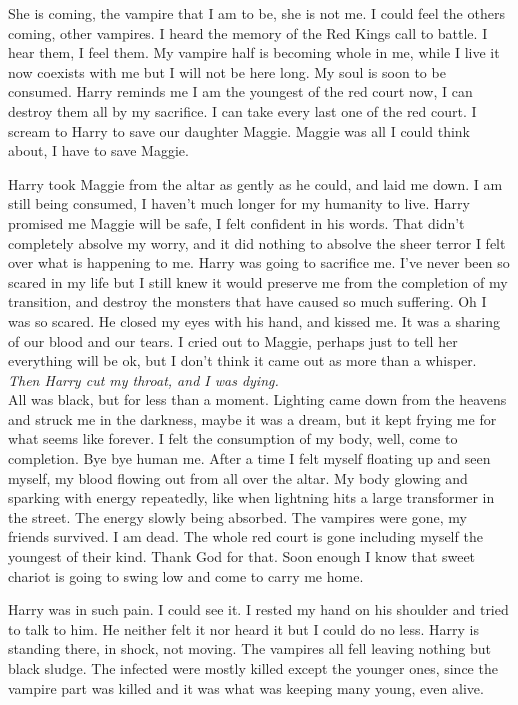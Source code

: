 She is coming, the vampire that I am to be, she is not me. I could feel the others coming, other vampires. I heard the memory of the Red Kings call to battle. I hear them, I feel them. My vampire half is becoming whole in me, while I live it now coexists with me but I will not be here long. My soul is soon to be consumed. Harry reminds me I am the youngest of the red court now, I can destroy them all by my sacrifice. I can take every last one of the red court. I scream to Harry to save our daughter Maggie. Maggie was all I could think about, I have to save Maggie.

Harry took Maggie from the altar as gently as he could, and laid me down. I am still being consumed, I haven't much longer for my humanity to live. Harry promised me Maggie will be safe, I felt confident in his words. That didn't completely absolve my worry, and it did nothing to absolve the sheer terror I felt over what is happening to me. Harry was going to sacrifice me. I've never been so scared in my life but I still knew it would preserve me from the completion of my transition, and destroy the monsters that have caused so much suffering. Oh I was so scared. He closed my eyes with his hand, and kissed me. It was a sharing of our blood and our tears. I cried out to Maggie, perhaps just to tell her everything will be ok, but I don't think it came out as more than a whisper.\\

\textit{Then Harry cut my throat, and I was dying.}\\

All was black, but for less than a moment. Lighting came down from the heavens and struck me in the darkness, maybe it was a dream, but it kept frying me for what seems like forever. I felt the consumption of my body, well, come to completion. Bye bye human me. After a time I felt myself floating up and seen myself, my blood flowing out from all over the altar. My body glowing and sparking with energy repeatedly, like when lightning hits a large transformer in the street. The energy slowly being absorbed. The vampires were gone, my friends survived. I am dead. The whole red court is gone including myself the youngest of their kind. Thank God for that. Soon enough I know that sweet chariot is going to swing low and come to carry me home.

Harry was in such pain. I could see it. I rested my hand on his shoulder and tried to talk to him. He neither felt it nor heard it but I could do no less. Harry is standing there, in shock, not moving. The vampires all fell leaving nothing but black sludge. The infected were mostly killed except the younger ones, since the vampire part was killed and it was what was keeping many young, even alive. 

